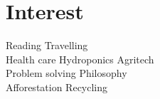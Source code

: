 \documentclass[]{deedy-resume-openfont}
\begin{document}
\begin{minipage}[t]{0.33\textwidth}

\section{Interest}
Reading \textbullet{} Travelling\\ 
Health care \textbullet{} Hydroponics
\textbullet{} Agritech \\
Problem solving \textbullet{} Philosophy\\
Afforestation \textbullet{}Recycling\\
\sectionsep

%
%

\end{minipage} 
\hfill
\end{document}
